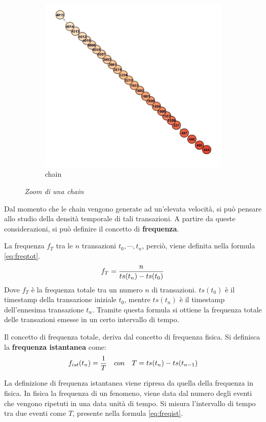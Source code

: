 \begin{figure}[htbp]
\begin{subfigure}[b]{0.4 \textwidth}
		\includegraphics[width=\textwidth]{figure/zoomchain2}
		\caption{chain}
		\label{fig:zoomchain2}
	\end{subfigure}
	\caption{\textit{Zoom di una chain}}\label{fig:zoomchain}
\end{figure}

Dal momento che le chain vengono generate ad un'elevata velocità, si può pensare allo studio della densità temporale di tali transazioni. A partire da queste considerazioni, si può definire il concetto di \textbf{frequenza}.

La frequenza $f_T$ tra le $n$ transazioni $t_0,\cdots,t_n$, perciò, viene definita nella formula \ref{eq:freqtot}.
\begin{equation}
\centering
f_T = \frac{n}{ts(t_n) - ts(t_0)}
\label{eq:freqtot}
\end{equation}
Dove $f_T$ è la frequenza totale tra un numero $n$ di transazioni. $ts(t_0)$ è il timestamp della transazione iniziale $t_0$, mentre $ts(t_n)$ è il timestamp dell'ennesima transazione $t_n$. Tramite questa formula si ottiene la frequenza totale delle transazioni emesse in un certo intervallo di tempo.

Il concetto di frequenza totale, deriva dal concetto di frequenza fisica. Si definisca la \textbf{frequenza istantanea} come:
\begin{equation}
\centering
f_{ist}(t_n) = \frac{1}{T}
\quad con \quad
T = ts(t_n) - ts(t_{n-1})
\label{eq:freqist}
\end{equation}

La definizione di frequenza istantanea viene ripresa da quella della frequenza in fisica. In fisica la frequenza di un fenomeno, viene data dal numero degli eventi che vengono ripetuti in una data unità di tempo. Si misura l'intervallo di tempo tra due eventi come $T$, presente nella formula \ref{eq:freqist}.
